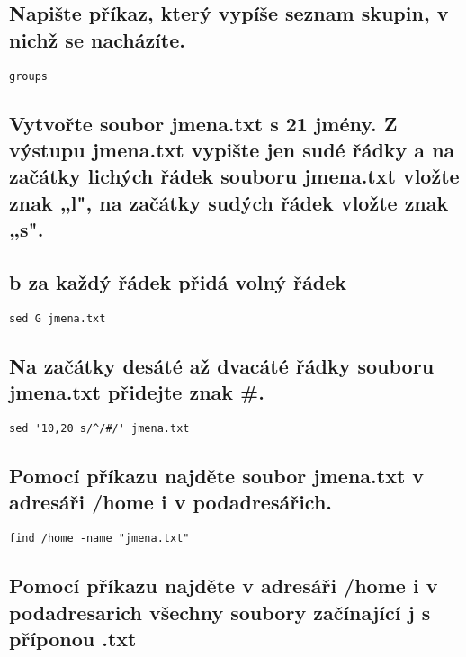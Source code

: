 \documentclass{article}
\begin{document}
\subsection{Napište příkaz, který vypíše seznam skupin, v nichž se nacházíte.}

\begin{lstlisting}
groups
\end{lstlisting}

\subsection{Vytvořte soubor jmena.txt s 21 jmény. Z výstupu jmena.txt vypište jen sudé řádky a  na začátky lichých řádek souboru jmena.txt vložte znak „l", na začátky sudých řádek vložte znak „s".}



\subsection{b za každý řádek přidá volný řádek}

\begin{lstlisting}
sed G jmena.txt
\end{lstlisting}

\subsection{Na začátky desáté až dvacáté řádky souboru jmena.txt přidejte znak \#.}

\begin{lstlisting}
sed '10,20 s/^/#/' jmena.txt
\end{lstlisting}

\subsection{Pomocí příkazu najděte soubor jmena.txt v adresáři /home i v podadresářich.}

\begin{lstlisting}
find /home -name "jmena.txt"
\end{lstlisting}

\subsection{Pomocí příkazu najděte v adresáři /home i v podadresarich všechny soubory začínající j s příponou .txt}
\end{document}
